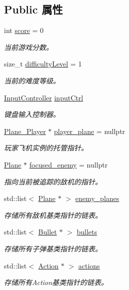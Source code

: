 \subsection*{Public 属性}
\begin{DoxyCompactItemize}
\item 
int \hyperlink{class_world_ae70b4ef5dd9cb9e7336169a25aaee39c}{score} = 0
\begin{DoxyCompactList}\small\item\em 当前游戏分数。 \end{DoxyCompactList}\item 
size\+\_\+t \hyperlink{class_world_a594e81a86f319eea4e8e5a2029cdaa90}{difficulty\+Level} = 1
\begin{DoxyCompactList}\small\item\em 当前的难度等级。 \end{DoxyCompactList}\item 
\hyperlink{class_input_controller}{Input\+Controller} \hyperlink{class_world_ae4cc86850d7092edbb7648d4cbd093aa}{input\+Ctrl}
\begin{DoxyCompactList}\small\item\em 键盘输入控制器。 \end{DoxyCompactList}\item 
\hyperlink{class_plane___player}{Plane\+\_\+\+Player} $\ast$ \hyperlink{class_world_ada7a87d1778bfc543635656ea8f12d3f}{player\+\_\+plane} = nullptr
\begin{DoxyCompactList}\small\item\em 玩家飞机实例的托管指针。 \end{DoxyCompactList}\item 
\hyperlink{class_plane}{Plane} $\ast$ \hyperlink{class_world_ac8553c1be4fb1e79e94bf9f63f834963}{focused\+\_\+enemy} = nullptr
\begin{DoxyCompactList}\small\item\em 指向当前被追踪的敌机的指针。 \end{DoxyCompactList}\item 
std\+::list$<$ \hyperlink{class_plane}{Plane} $\ast$ $>$ \hyperlink{class_world_a9692ac6798300e7fde98eb3ef1bb7c79}{enemy\+\_\+planes}
\begin{DoxyCompactList}\small\item\em 存储所有敌机基类指针的链表。 \end{DoxyCompactList}\item 
std\+::list$<$ \hyperlink{class_bullet}{Bullet} $\ast$ $>$ \hyperlink{class_world_a932c82c701ec6d13e2857943562954f2}{bullets}
\begin{DoxyCompactList}\small\item\em 存储所有子弹基类指针的链表。 \end{DoxyCompactList}\item 
std\+::list$<$ \hyperlink{class_action}{Action} $\ast$ $>$ \hyperlink{class_world_aefe8e0e9e418bbf81671314bf8d019f2}{actions}
\begin{DoxyCompactList}\small\item\em 存储所有\+Action基类指针的链表。 \end{DoxyCompactList}\end{DoxyCompactItemize}
